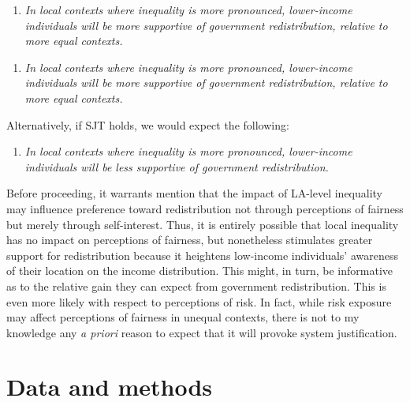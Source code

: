 \documentclass[12pt, letter]{scrartcl}
\begin{document}
\vspace{15pt}
\singlespacing
\begin{enumerate}[label= \textbf{Hypothesis 2a (H2a)},  leftmargin=*]
  \item \textit{In local contexts where inequality is more pronounced, lower-income individuals will be more supportive of government redistribution, relative to more equal contexts.}
\end{enumerate}

\begin{enumerate}[label= \textbf{Hypothesis 2b (H2b)},  leftmargin=*]
  \item \textit{In local contexts where inequality is more pronounced, lower-income individuals will be more supportive of government redistribution, relative to more equal contexts.}
\end{enumerate}

\doublespacing

Alternatively, if SJT holds, we would expect the following:

\vspace{15pt}
\singlespacing
\begin{enumerate}[label= \textbf{Hypothesis 2c (H2c)},  leftmargin=*]
  \item \textit{In local contexts where inequality is more pronounced, lower-income individuals will be less supportive of government redistribution.}
\end{enumerate}
\doublespacing

Before proceeding, it warrants mention that the impact of LA-level inequality may influence preference toward redistribution not through perceptions of fairness but merely through self-interest. Thus, it is entirely possible that local inequality has no impact on perceptions of fairness, but nonetheless stimulates greater support for redistribution because it heightens low-income individuals' awareness of their location on the income distribution. This might, in turn, be informative as to the relative gain they can expect from government redistribution. This is even more likely with respect to perceptions of risk. In fact, while risk exposure may affect perceptions of fairness in unequal contexts, there is not to my knowledge any \textit{a priori} reason to expect that it will provoke system justification. 

\vspace{15pt}
\singlespacing
\section{Data and methods}
\doublespacing
\end{document}
